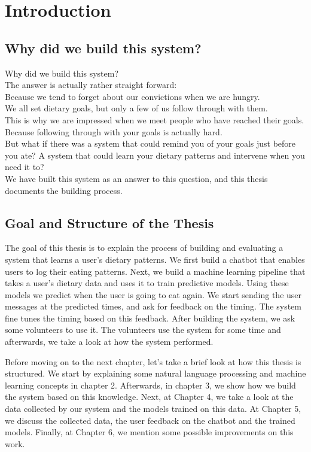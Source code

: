 \chapter{Introduction}\label{chapter:introduction}

\newenvironment{absolutelynopagebreak}
  {\par\nobreak\vfil\penalty0\vfilneg
   \vtop\bgroup}
  {\par\xdef\tpd{\the\prevdepth}\egroup
   \prevdepth=\tpd}

\section{Why did we build this system?}
Why did we build this system?\\ 
The answer is actually rather straight forward:\\
Because we tend to forget about our convictions when we are hungry.\\
We all set dietary goals, but only a few of us follow through with them.\\
This is why we are impressed when we meet people who have reached their goals.\\
Because following through with your goals is actually hard.\\
But what if there was a system that could remind you of your goals just before you ate?
A system that could learn your dietary patterns and intervene when you need it to?\\
We have built this system as an answer to this question, and this thesis documents the building process.

\section{Goal and Structure of the Thesis}
The goal of this thesis is to explain the process of building and evaluating a system that learns a user's dietary patterns.
We first build a chatbot that enables users to log their eating patterns.
Next, we build a machine learning pipeline that takes a user's dietary data and uses it to train predictive models.
Using these models we predict when the user is going to eat again.
We start sending the user messages at the predicted times, and ask for feedback on the timing.
The system fine tunes the timing based on this feedback.
After building the system, we ask some volunteers to use it.
The volunteers use the system for some time and afterwards, we take a look at how the system performed.

Before moving on to the next chapter, let's take a brief look at how this thesis is structured.
We start by explaining some natural language processing and machine learning concepts in chapter 2.
Afterwards, in chapter 3, we show how we build the system based on this knowledge.
Next, at Chapter 4, we take a look at the data collected by our system and the models trained on this data.
At Chapter 5, we discuss the collected data, the user feedback on the chatbot and the trained models.
Finally, at Chapter 6, we mention some possible improvements on this work.
